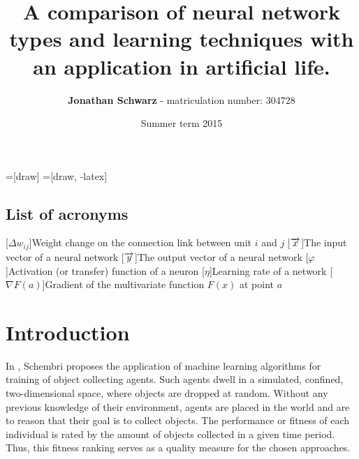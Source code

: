 \documentclass[10pt,a4paper,DIV=11]{scrreprt}
\title
{
     A comparison of neural network types and learning techniques with an application in artificial life.
}
\author
{
    \textbf{Jonathan Schwarz} - matriculation number: 304728
}
\date
{
    Summer term 2015
}
\begin{document}
=[draw]
=[draw, -latex] 


\maketitle
\thispagestyle{empty}
\newpage
{\large\tableofcontents}
\newpage

\thispagestyle{empty}

\section*{List of acronyms}
\begin{acronym}
    [$\Delta w_{ij}$]{Weight change on the connection link between unit $i$ and $j$}
    [$\protect \overrightarrow{x}$]{The input vector of a neural network}
    [$\protect \overrightarrow{y}$]{The output vector of a neural network}
    [$\varphi$]{Activation (or transfer) function of a neuron}
    [$\eta$]{Learning rate of a network}
    [$\nabla F(a)$]{Gradient of the multivariate function $F(x)$ at point $a$}
\end{acronym}

\newpage

\chapter{Introduction}
\label{ch:intro}
In \cite{DANIEL}, Schembri proposes the application of machine learning algorithms for training of object collecting agents. 
Such agents dwell in a simulated, confined, two-dimensional space, where objects are dropped at random. Without any previous knowledge of 
their environment, agents are placed in the world and are to reason that their goal is to collect objects. The performance or fitness of each 
individual is rated by the amount of objects collected in a given time period. Thus, this fitness ranking serves as a quality measure for the 
chosen approaches.
\end{document}
